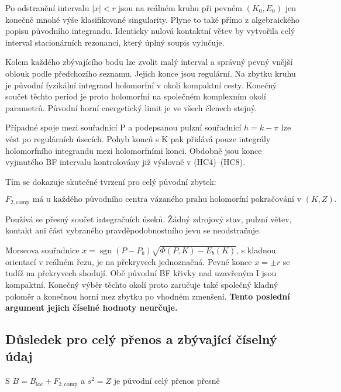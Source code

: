 \documentclass[11pt,a4paper]{article}
\theoremstyle{remark}\newtheorem{remark}[theorem]{Poznámka}
\numberwithin{equation}{section}
\begin{document}
Po odstranění intervalu \(|x|<r\) jsou na reálném kruhu při pevném
\((K_0,E_0)\) jen konečně mnohé výše klasifikované singularity. Plyne to
také přímo z algebraického popisu původního integrandu. Identicky nulová
kontaktní větev by vytvořila celý interval stacionárních rezonancí,
který úplný soupis vylučuje.

Kolem každého zbývajícího bodu lze zvolit malý interval a správný pevný
vnější oblouk podle předchozího seznamu. Jejich konce jsou regulární. Na
zbytku kruhu je původní fyzikální integrand holomorfní v okolí kompaktní
cesty. Konečný součet těchto period je proto holomorfní na společném
komplexním okolí parametrů. Původní horní energetický limit je ve všech
členech stejný.

Případné spoje mezi souřadnicí P a podepsanou pulzní souřadnicí
\(h=k-\pi\) lze vést po regulárních úsecích. Pohyb konců s K pak přidává
pouze integrály holomorfního integrandu mezi holomorfními konci. Obdobně
jsou konce vyjmutého BF intervalu kontrolovány již výslovně v
(HC4)--(HC8).

Tím se dokazuje skutečné tvrzení pro celý původní zbytek:

\[
\boxed{
F_{2,\mathrm{comp}}\text{ má u každého původního centra vázaného prahu}
\text{ holomorfní pokračování v }(K,Z).}
\tag{HC11}
\]

Používá se přesný součet integračních úseků. Žádný zdrojový stav, pulzní
větev, kontakt ani část vybraného pravděpodobnostního jevu se
neodstraňuje.

Morseova souřadnice
\(x=\operatorname{sgn}(P-P_b) \sqrt{\Phi(P,K)-E_b(K)}\), s kladnou
orientací v reálném řezu, je na překryvech jednoznačná. Pevné konce
\(x=\pm r\) se tudíž na překryvech shodují. Obě původní BF křivky nad
uzavřeným I jsou kompaktní. Konečný výběr těchto okolí proto zaručuje
také společný kladný poloměr a konečnou horní mez zbytku po vhodném
zmenšení. \textbf{Tento poslední argument jejich číselné hodnoty
neurčuje.}

\hypertarget{dux16fsledek-pro-celuxfd-pux159enos-a-zbuxfdvajuxedcuxed-ux10duxedselnuxfd-uxfadaj}{%
\subsection{Důsledek pro celý přenos a zbývající číselný
údaj}\label{dux16fsledek-pro-celuxfd-pux159enos-a-zbuxfdvajuxedcuxed-ux10duxedselnuxfd-uxfadaj}}

S \(B=B_{\mathrm{loc}}+F_{2,\mathrm{comp}}\) a \(s^2=Z\) je původní celý
přenos přesně
\end{document}
